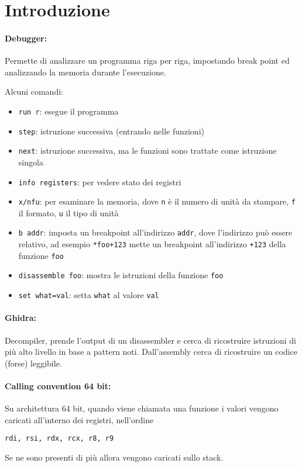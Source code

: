 
\section{Introduzione}

\paragraph{Debugger:} Permette di analizzare un programma riga per riga, impostando break point ed analizzando la memoria durante l'esecuzione.

Alcuni comandi: 
\begin{itemize}
	\item \texttt{run r}: esegue il programma

	\item \texttt{step}: istruzione successiva (entrando nelle funzioni)

	\item \texttt{next}: istruzione successiva, ma le funzioni sono trattate come istruzione singola 

	\item \texttt{info registers}: per vedere stato dei registri

	\item \texttt{x/nfu}: per esaminare la memoria, dove \texttt{n} è il numero di unità da stampare, \texttt{f} il formato, \texttt{u} il tipo di unità

	\item \texttt{b addr}: imposta un breakpoint all'indirizzo \texttt{addr}, dove l'indirizzo può essere relativo, ad esempio \texttt{*foo+123} mette un breakpoint all'indirizzo \texttt{+123} della funzione \texttt{foo}

	\item \texttt{disassemble foo}: mostra le istruzioni della funzione \texttt{foo}

	\item \texttt{set what=val}: setta \texttt{what} al valore \texttt{val}
\end{itemize}

\paragraph{Ghidra:} Decompiler, prende l'output di un disassembler e cerca di ricostruire istruzioni di più alto livello in base a pattern noti. Dall'assembly cerca di ricostruire un codice (forse) leggibile.

\paragraph{Calling convention 64 bit:} Su architettura 64 bit, quando viene chiamata una funzione i valori vengono caricati all'interno dei registri, nell'ordine
\begin{center}
	\texttt{rdi, rsi, rdx, rcx, r8, r9}
\end{center}
Se ne sono presenti di più allora vengono caricati sullo stack.